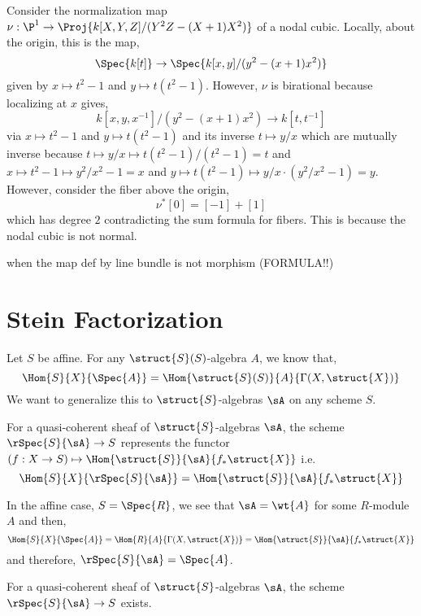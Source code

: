 \documentclass[12pt]{article}
\begin{document}
\begin{example}
Consider the normalization map $\nu : \P^1 \to \Proj{k[X,Y,Z]/(Y^2 Z - (X+1)X^2)}$ of a nodal cubic. Locally, about the origin, this is the map,
\[ \Spec{k[t]} \to \Spec{k[x,y]/(y^2 - (x+1)x^2)} \]
given by $x \mapsto t^2-1$ and $y \mapsto t(t^2 - 1)$.
However, $\nu$ is birational because localizing at $x$ gives,
\[ k[x,y,x^{-1}]/(y^2 - (x+1)x^2) \to k[t, t^{-1}] \]
via $x \mapsto t^2-1$ and $y \mapsto t(t^2 - 1)$ and its inverse $t \mapsto y/x$ which are mutually inverse because $t \mapsto y/x \mapsto t(t^2-1)/(t^2-1) = t$ and $x \mapsto t^2-1 \mapsto y^2/x^2-1 = x$ and $y \mapsto t(t^2-1) \mapsto y/x \cdot (y^2/x^2-1) = y$. However, consider the fiber above the origin,
\[ \nu^* [0] = [-1] + [1] \]
which has degree $2$ contradicting the sum formula for fibers. This is because the nodal cubic is not normal. 
\end{example}

\begin{example}
when the map def by line bundle is not morphism (FORMULA!!)
\end{example}


\section{Stein Factorization}

\begin{rmk}
Let $S$ be affine. For any $\struct{S}(S)$-algebra $A$, we know that,
\[ \Hom{S}{X}{\Spec{A}} = \Hom{\struct{S}(S)}{A}{\Gamma(X, \struct{X})} \]
We want to generalize this to $\struct{S}$-algebras $\sA$ on any scheme $S$.
\end{rmk}

\begin{defn}
For a quasi-coherent sheaf of $\struct{S}$-algebras $\sA$, the scheme $\rSpec{S}{\sA} \to S$ represents the functor $(f : X \to S) \mapsto \Hom{\struct{S}}{\sA}{f_* \struct{X}}$ i.e.
\[ \Hom{S}{X}{\rSpec{S}{\sA}} = \Hom{\struct{S}}{\sA}{f_* \struct{X}} \]
\end{defn}

\begin{rmk}
In the affine case, $S = \Spec{R}$, we see that $\sA = \wt{A}$ for some $R$-module $A$ and then,
\[ \Hom{S}{X}{\Spec{A}} = \Hom{R}{A}{\Gamma(X, \struct{X})} = \Hom{\struct{S}}{\sA}{f_* \struct{X}} \]
and therefore, $\rSpec{S}{\sA} = \Spec{A}$.  
\end{rmk}

\begin{theorem}
For a quasi-coherent sheaf of $\struct{S}$-algebras $\sA$, the scheme $\rSpec{S}{\sA} \to S$ exists. 
\end{theorem}
\end{document}
